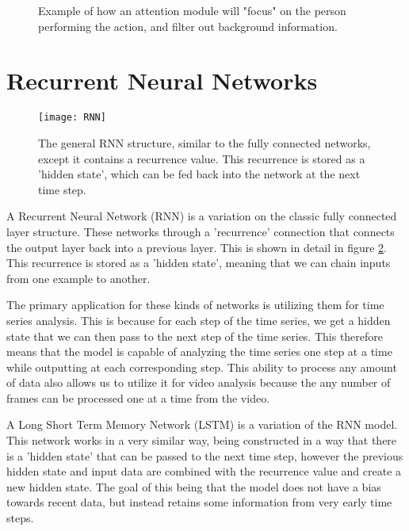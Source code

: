 \begin{figure}[ht]
	\centering
	\caption{Example of how an attention module will "focus" on the person performing the action, and filter out background information.}
	\label{fig:residualattentionnetwork}
\end{figure}

\section{Recurrent Neural Networks}

\begin{figure}[ht]
	\texttt{[image: RNN]}
	\centering
	\caption{The general RNN structure, similar to the fully connected networks, except it contains a recurrence value. This recurrence is stored as a 'hidden state', which can be fed back into the network at the next time step.}
	\label{fig:rnn}
\end{figure}

A Recurrent Neural Network (RNN) is a variation on the classic fully connected layer structure. These networks through a 'recurrence' connection that connects the output layer back into a previous layer. This is shown in detail in figure \ref{fig:rnn}. This recurrence is stored as a 'hidden state', meaning that we can chain inputs from one example to another.

The primary application for these kinds of networks is utilizing them for time series analysis. This is because for each step of the time series, we get a hidden state that we can then pass to the next step of the time series. This therefore means that the model is capable of analyzing the time series one step at a time while outputting at each corresponding step. This ability to process any amount of data also allows us to utilize it for video analysis because the any number of frames can be processed one at a time from the video.

A Long Short Term Memory Network (LSTM) is a variation of the RNN model. This network works in a very similar way, being constructed in a way that there is a 'hidden state' that can be passed to the next time step, however the previous hidden state and input data are combined with the recurrence value and create a new hidden state. The goal of this being that the model does not have a bias towards recent data, but instead retains some information from very early time steps.

